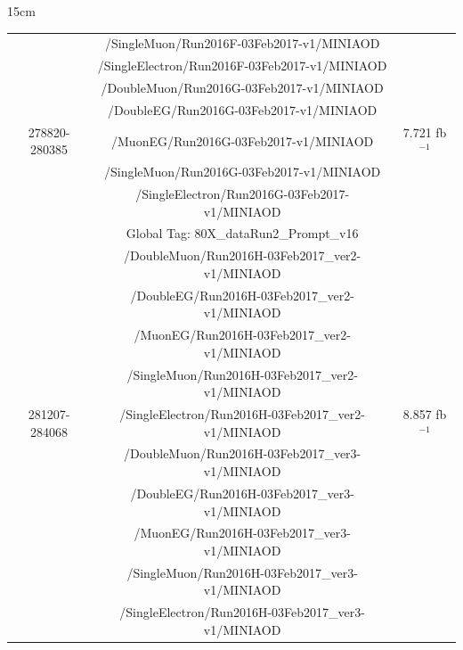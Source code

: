 \begin{table}[htbp]{15cm}
\begin{tabular}{c|c|c}
		& /SingleMuon/Run2016F-03Feb2017-v1/MINIAOD &\\
		& /SingleElectron/Run2016F-03Feb2017-v1/MINIAOD &\\
		\hline
		& /DoubleMuon/Run2016G-03Feb2017-v1/MINIAOD &\\
		& /DoubleEG/Run2016G-03Feb2017-v1/MINIAOD &\\
		278820-280385 & /MuonEG/Run2016G-03Feb2017-v1/MINIAOD & 7.721 fb$^{-1}$\\
		& /SingleMuon/Run2016G-03Feb2017-v1/MINIAOD &\\
		& /SingleElectron/Run2016G-03Feb2017-v1/MINIAOD &\\
		\hline
		& Global Tag: 80X\_dataRun2\_Prompt\_v16 &\\
		\hline
		& /DoubleMuon/Run2016H-03Feb2017\_ver2-v1/MINIAOD
		&\\
		& /DoubleEG/Run2016H-03Feb2017\_ver2-v1/MINIAOD
		&\\
		& /MuonEG/Run2016H-03Feb2017\_ver2-v1/MINIAOD
		&\\
		& /SingleMuon/Run2016H-03Feb2017\_ver2-v1/MINIAOD
		&\\
		281207-284068 & /SingleElectron/Run2016H-03Feb2017\_ver2-v1/MINIAOD
		& 8.857 fb$^{-1}$\\
		& /DoubleMuon/Run2016H-03Feb2017\_ver3-v1/MINIAOD
		&\\
		& /DoubleEG/Run2016H-03Feb2017\_ver3-v1/MINIAOD
		&\\ 
		& /MuonEG/Run2016H-03Feb2017\_ver3-v1/MINIAOD
		&\\
		& /SingleMuon/Run2016H-03Feb2017\_ver3-v1/MINIAOD
		&\\
		& /SingleElectron/Run2016H-03Feb2017\_ver3-v1/MINIAOD
		&\\
		\hline
	\end{tabular}
	\label{tab:datasets_list}
\end{table}

